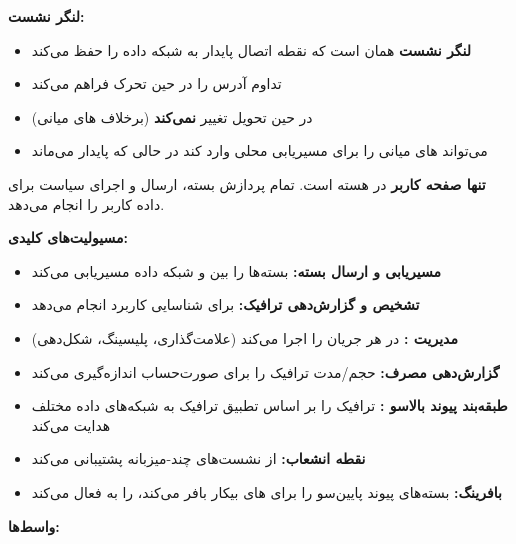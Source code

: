 \textbf{لنگر نشست:}

\begin{itemize}
\tightlist
\item
  \textbf{لنگر نشست } همان  است که نقطه اتصال پایدار به شبکه داده را حفظ می‌کند
\item
  تداوم آدرس  را در حین تحرک  فراهم می‌کند
\item
  در حین تحویل تغییر \textbf{نمی‌کند} (برخلاف های میانی)
\item
   می‌تواند های میانی  را برای مسیریابی محلی وارد کند در حالی که  پایدار می‌ماند
\end{itemize}


 \textbf{تنها  صفحه کاربر} در هسته  است. تمام پردازش بسته، ارسال و اجرای سیاست برای داده کاربر را انجام می‌دهد.

\textbf{مسیولیت‌های کلیدی:}

\begin{itemize}
\tightlist
\item
  \textbf{مسیریابی و ارسال بسته:} بسته‌ها را بین  و شبکه داده مسیریابی می‌کند
\item
  \textbf{تشخیص و گزارش‌دهی ترافیک:} برای شناسایی کاربرد  انجام می‌دهد
\item
  \textbf{مدیریت :}  در هر جریان را اجرا می‌کند (علامت‌گذاری، پلیسینگ، شکل‌دهی)
\item
  \textbf{گزارش‌دهی مصرف:} حجم/\allowbreak{}مدت ترافیک را برای صورت‌حساب اندازه‌گیری می‌کند
\item
  \textbf{طبقه‌بند پیوند بالاسو :} ترافیک را بر اساس تطبیق ترافیک به شبکه‌های داده مختلف هدایت می‌کند
\item
  \textbf{نقطه انشعاب:} از نشست‌های  چند-میزبانه پشتیبانی می‌کند
\item
  \textbf{بافرینگ:} بسته‌های پیوند پایین‌سو را برای های بیکار بافر می‌کند،  را به  فعال می‌کند
\end{itemize}


\textbf{واسط‌ها:}

